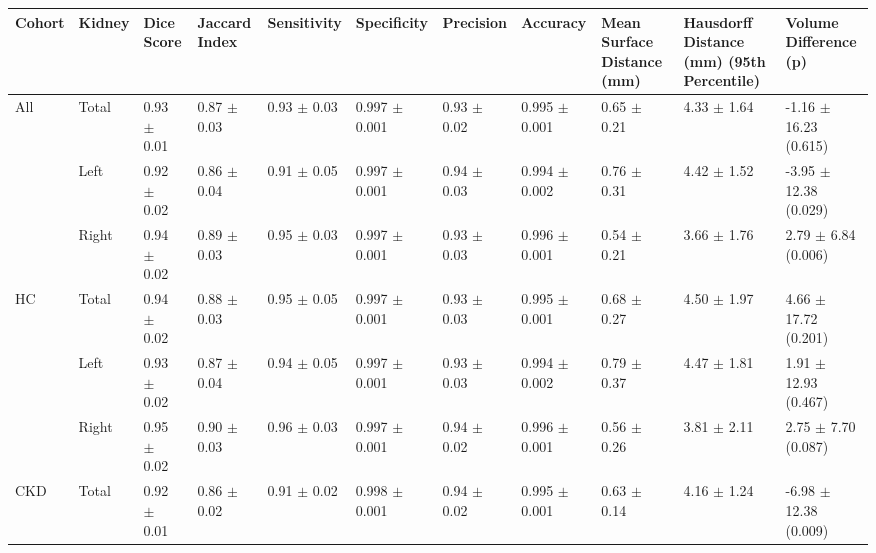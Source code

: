 \begin{landscape}
\begin{table}[H]
	\centering
	\begin{adjustbox}{width=\hsize, center}
	\begin{tabularx}{1.3\hsize}{XX||X|X|X|X|X|X|X|X|X}
		Cohort               & Kidney & Dice   Score  & Jaccard   Index & Sensitivity   & Specificity     & Precision     & Accuracy        & Mean   Surface Distance (mm) & Hausdorff   Distance (mm) (95th Percentile) & Volume   Difference (p)  \\ \hline
		\multirow{3}{*}{All} & Total  & 0.93 $\pm$   0.01 & 0.87 $\pm$   0.03   & 0.93 $\pm$   0.03 & 0.997   $\pm$ 0.001 & 0.93 $\pm$   0.02 & 0.995   $\pm$ 0.001 & 0.65 $\pm$   0.21                & 4.33 $\pm$   1.64                               & -1.16   $\pm$ 16.23 (0.615)  \\ \cline{2-11} 
		& Left   & 0.92 $\pm$ 0.02   & 0.86 $\pm$ 0.04     & 0.91 $\pm$ 0.05   & 0.997 $\pm$ 0.001   & 0.94 $\pm$ 0.03   & 0.994 $\pm$ 0.002   & 0.76 $\pm$ 0.31                  & 4.42 $\pm$ 1.52                                 & -3.95 $\pm$ 12.38   (0.029)  \\ \cline{2-11} 
		& Right  & 0.94 $\pm$   0.02 & 0.89 $\pm$   0.03   & 0.95 $\pm$   0.03 & 0.997   $\pm$ 0.001 & 0.93 $\pm$   0.03 & 0.996   $\pm$ 0.001 & 0.54 $\pm$   0.21                & 3.66 $\pm$   1.76                               & 2.79 $\pm$   6.84 (0.006)    \\ \hline
		\multirow{3}{*}{HC}  & Total  & 0.94 $\pm$ 0.02   & 0.88 $\pm$ 0.03     & 0.95 $\pm$ 0.05   & 0.997 $\pm$ 0.001   & 0.93 $\pm$ 0.03   & 0.995 $\pm$ 0.001   & 0.68 $\pm$ 0.27                  & 4.50 $\pm$ 1.97                                 & 4.66 $\pm$ 17.72 (0.201)     \\ \cline{2-11} 
		& Left   & 0.93 $\pm$   0.02 & 0.87 $\pm$   0.04   & 0.94 $\pm$   0.05 & 0.997   $\pm$ 0.001 & 0.93 $\pm$   0.03 & 0.994   $\pm$ 0.002 & 0.79 $\pm$   0.37                & 4.47 $\pm$   1.81                               & 1.91 $\pm$   12.93 (0.467)   \\ \cline{2-11} 
		& Right  & 0.95 $\pm$ 0.02   & 0.90 $\pm$ 0.03     & 0.96 $\pm$ 0.03   & 0.997 $\pm$ 0.001   & 0.94 $\pm$ 0.02   & 0.996 $\pm$ 0.001   & 0.56 $\pm$ 0.26                  & 3.81 $\pm$ 2.11                                 & 2.75 $\pm$ 7.70   (0.087)    \\ \hline
		\multirow{3}{*}{CKD} & Total  & 0.92 $\pm$   0.01 & 0.86 $\pm$   0.02   & 0.91 $\pm$   0.02 & 0.998   $\pm$ 0.001 & 0.94 $\pm$   0.02 & 0.995   $\pm$ 0.001 & 0.63 $\pm$   0.14                & 4.16 $\pm$   1.24                               & -6.98   $\pm$12.38 (0.009)   \\ \cline{2-11} 

\end{tabularx}
\end{adjustbox}
\end{table}
\end{landscape}
